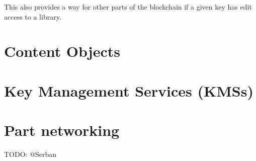 \documentclass{article}
\begin{document}
This also provides a way for other parts of the blockchain if a given key has edit access to a library.

\section{Content Objects}

\section{Key Management Services (KMSs)}

\section{Part networking}
TODO: @Serban
\end{document}
